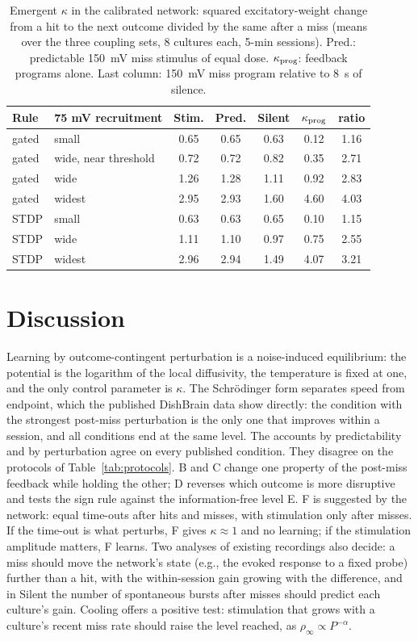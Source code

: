 \documentclass[pre,twocolumn,superscriptaddress,showpacs=false,amsmath,amssymb,nofootinbib]{revtex4-2}
\begin{document}
\begin{table}[t]
\caption{Emergent $\kappa$ in the calibrated network: squared excitatory-weight change from a hit to the next outcome divided by the same after a miss (means over the three coupling sets, 8 cultures each, 5-min sessions). Pred.: predictable 150~mV miss stimulus of equal dose. $\kappa_{\rm prog}$: feedback programs alone. Last column: 150~mV miss program relative to 8~s of silence.}
\label{tab:kappa}
\footnotesize
\begin{ruledtabular}
\begin{tabular}{llccccc}
Rule & 75 mV recruitment & Stim. & Pred. & Silent & $\kappa_{\rm prog}$ & ratio \\
\hline
gated & small & 0.65 & 0.65 & 0.63 & 0.12 & 1.16 \\
gated & wide, near threshold & 0.72 & 0.72 & 0.82 & 0.35 & 2.71 \\
gated & wide & 1.26 & 1.28 & 1.11 & 0.92 & 2.83 \\
gated & widest & 2.95 & 2.93 & 1.60 & 4.60 & 4.03 \\
STDP & small & 0.63 & 0.63 & 0.65 & 0.10 & 1.15 \\
STDP & wide & 1.11 & 1.10 & 0.97 & 0.75 & 2.55 \\
STDP & widest & 2.96 & 2.94 & 1.49 & 4.07 & 3.21 \\
\end{tabular}
\end{ruledtabular}
\end{table}

\section{Discussion}\label{sec:discussion}

Learning by outcome-contingent perturbation is a noise-induced equilibrium: the potential is the logarithm of the local diffusivity, the temperature is fixed at one, and the only control parameter is $\kappa$. The Schr\"odinger form separates speed from endpoint, which the published DishBrain data show directly: the condition with the strongest post-miss perturbation is the only one that improves within a session, and all conditions end at the same level. The accounts by predictability and by perturbation agree on every published condition. They disagree on the protocols of Table~\ref{tab:protocols}. B and C change one property of the post-miss feedback while holding the other; D reverses which outcome is more disruptive and tests the sign rule against the information-free level E. F is suggested by the network: equal time-outs after hits and misses, with stimulation only after misses. If the time-out is what perturbs, F gives $\kappa\approx1$ and no learning; if the stimulation amplitude matters, F learns. Two analyses of existing recordings also decide: a miss should move the network's state (e.g., the evoked response to a fixed probe) further than a hit, with the within-session gain growing with the difference, and in Silent the number of spontaneous bursts after misses should predict each culture's gain. Cooling offers a positive test: stimulation that grows with a culture's recent miss rate should raise the level reached, as $\rho_\infty\propto P^{-\alpha}$.
\end{document}
